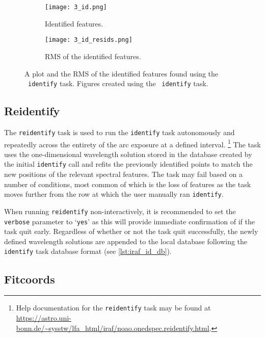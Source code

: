 \begin{figure}
    \centering
    \begin{subfigure}[b]{0.49\textwidth}
        \centering
        \texttt{[image: 3\_id.png]}
        \caption{Identified features.}
    \end{subfigure}
    \hfill
    \begin{subfigure}[b]{0.49\textwidth}
        \centering
        \texttt{[image: 3\_id\_resids.png]}
        \caption{\gls{RMS} of the identified features.}
    \end{subfigure}
    \caption{A plot and the \gls{RMS} of the identified features found using the \iraf\ \texttt{identify} task. Figures created using the \iraf\ \texttt{identify} task.}
    \label{fig:iraf_id_plot}
\end{figure}

\pagebreak

\subsection{Reidentify}

The \texttt{reidentify} task is used to run the \texttt{identify} task autonomously and repeatedly across the entirety of the arc exposure at a defined interval.%
\footnote{Help documentation for the \texttt{reidentify} task may be found at \url{https://astro.uni-bonn.de/~sysstw/lfa_html/iraf/noao.onedspec.reidentify.html}.}
The task uses the one-dimensional wavelength solution stored in the database created by the initial \texttt{identify} call and refits the previously identified points to match the new positions of the relevant spectral features. The task may fail based on a number of conditions, most common of which is the loss of features as the task moves further from the row at which the user manually ran \texttt{identify}.

When running \texttt{reidentify} non-interactively, it is recommended to set the \texttt{verbose} parameter to `\texttt{yes}' as this will provide immediate confirmation of if the task quit early. Regardless of whether or not the task quit successfully, the newly defined wavelength solutions are appended to the local database following the \texttt{identify} task database format (see \autoref{lst:iraf_id_db}).

\subsection{Fitcoords} \label{subsec:iraf_fitcoords}

